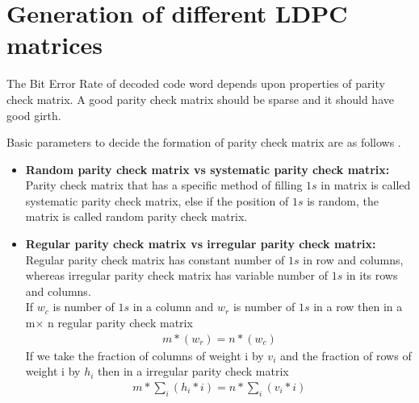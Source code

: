 
\chapter{Generation of different LDPC matrices} 

\label{Chapter2} 


The Bit Error Rate of decoded code word depends upon properties of parity check matrix. A good parity check matrix should be sparse and  it should have good girth.  

Basic parameters to decide the formation of parity check matrix are as follows . 
\begin{itemize}
\item  \textbf{Random parity check matrix vs systematic parity check matrix:} Parity check matrix that has a specific method of filling $1s$ in matrix is called systematic parity check matrix, else if the position of $1s$ is random, the matrix is called random parity check matrix.
\item\textbf{Regular parity check matrix vs irregular parity check matrix:} Regular parity check matrix has constant number of $1s$ in row and columns, whereas irregular parity check matrix has variable number of $1s$ in its rows and columns. \\
	If $w_c$ is number of $1s$ in a column and $w_r $ is number of $1s$ in a row then in a m$\times$ n regular parity check matrix
\begin{align}
 m * ( w_r ) = n * ( w_c )  
\end{align}
If we take the fraction of columns
of weight i by $v_i$ and the fraction of rows of weight i by $h_i$ then in a irregular parity check matrix
\begin{align} m * \sum_{i} (h_i*i) = n *\sum_{i} (v_i*i) 
\end{align}


\end{itemize} 
